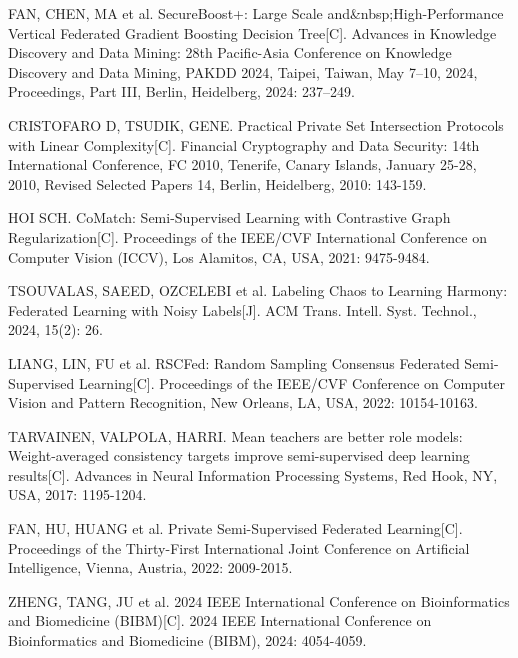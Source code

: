 \begin{thebibliography}{200}
	\wuhao %
	\linespread{1}\selectfont
	\setlength{\itemsep}{-1.4ex} %
	\thispagestyle{others}
	\pagestyle{others}
	
	\makeatletter
	\renewcommand\@biblabel[1]{[#1]\hfill} %
	\makeatother
	\setlength{\labelsep}{0cm}
	
	
	FAN, CHEN, MA et al. SecureBoost+: Large Scale and\&nbsp;High-Performance Vertical Federated Gradient Boosting Decision Tree[C]. Advances in Knowledge Discovery and Data Mining: 28th Pacific-Asia Conference on Knowledge Discovery and Data Mining, PAKDD 2024, Taipei, Taiwan, May 7–10, 2024, Proceedings, Part III, Berlin, Heidelberg, 2024: 237–249.
	
	CRISTOFARO D, TSUDIK, GENE. Practical Private Set Intersection Protocols with Linear Complexity[C]. Financial Cryptography and Data Security: 14th International Conference, FC 2010, Tenerife, Canary Islands, January 25-28, 2010, Revised Selected Papers 14, Berlin, Heidelberg, 2010: 143-159.
	
	HOI SCH. CoMatch: Semi-Supervised Learning with Contrastive Graph Regularization[C]. Proceedings of the IEEE/CVF International Conference on Computer Vision (ICCV), Los Alamitos, CA, USA, 2021: 9475-9484.
	
	TSOUVALAS, SAEED, OZCELEBI et al. Labeling Chaos to Learning Harmony: Federated Learning with Noisy Labels[J]. ACM Trans. Intell. Syst. Technol., 2024, 15(2): 26.
	
	LIANG, LIN, FU et al. RSCFed: Random Sampling Consensus Federated Semi-Supervised Learning[C]. Proceedings of the IEEE/CVF Conference on Computer Vision and Pattern Recognition, New Orleans, LA, USA, 2022: 10154-10163.
	
	TARVAINEN, VALPOLA, HARRI. Mean teachers are better role models: Weight-averaged consistency targets improve semi-supervised deep learning results[C]. Advances in Neural Information Processing Systems, Red Hook, NY, USA, 2017: 1195-1204.
	
	FAN, HU, HUANG et al. Private Semi-Supervised Federated Learning[C]. Proceedings of the Thirty-First International Joint Conference on Artificial Intelligence, Vienna, Austria, 2022: 2009-2015.
	
	ZHENG, TANG, JU et al. 2024 IEEE International Conference on Bioinformatics and Biomedicine (BIBM)[C]. 2024 IEEE International Conference on Bioinformatics and Biomedicine (BIBM), 2024: 4054-4059.
	

\end{thebibliography}
